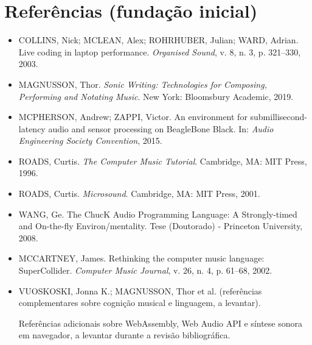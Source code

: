 \documentclass[12pt,a4paper]{article}
\begin{document}
\section*{Referências (fundação inicial)}

\begin{itemize}[leftmargin=1.5cm]
  \item COLLINS, Nick; MCLEAN, Alex; ROHRHUBER, Julian; WARD, Adrian. Live coding in laptop performance. \emph{Organised Sound}, v. 8, n. 3, p. 321–330, 2003.
  \item MAGNUSSON, Thor. \emph{Sonic Writing: Technologies for Composing, Performing and Notating Music}. New York: Bloomsbury Academic, 2019.
  \item MCPHERSON, Andrew; ZAPPI, Victor. An environment for submillisecond-latency audio and sensor processing on BeagleBone Black. In: \emph{Audio Engineering Society Convention}, 2015.
  \item ROADS, Curtis. \emph{The Computer Music Tutorial}. Cambridge, MA: MIT Press, 1996.
  \item ROADS, Curtis. \emph{Microsound}. Cambridge, MA: MIT Press, 2001.
  \item WANG, Ge. The ChucK Audio Programming Language: A Strongly-timed and On-the-fly Environ/mentality. Tese (Doutorado) - Princeton University, 2008.
  \item MCCARTNEY, James. Rethinking the computer music language: SuperCollider. \emph{Computer Music Journal}, v. 26, n. 4, p. 61–68, 2002.
  \item VUOSKOSKI, Jonna K.; MAGNUSSON, Thor et al. (referências complementares sobre cognição musical e linguagem, a levantar).
  \item [Referências adicionais sobre WebAssembly, Web Audio API e síntese sonora em navegador, a levantar durante a revisão bibliográfica.]
\end{itemize}
\end{document}
